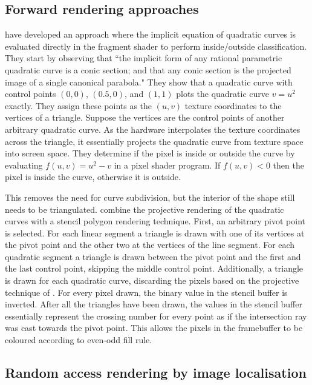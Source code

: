 \documentclass[11pt,a4paper,twoside]{article}
\begin{document}
\subsection {Forward rendering approaches}

\cite{LoopBlinn05} have developed an approach where the implicit equation of quadratic curves is evaluated directly in the fragment shader to perform inside/outside classification. They start by observing that ``the implicit form of any rational parametric quadratic curve is a conic section; and that any conic section is the projected image of a single canonical parabola." They show that a quadratic curve with control points $(0,0)$, $(0.5,0)$, and $(1,1)$ plots the quadratic curve $v = u^2$ exactly. They assign these points as the $(u,v)$ texture coordinates to the vertices of a triangle. Suppose the vertices are the control points of another arbitrary quadratic curve. As the hardware interpolates the texture coordinates across the triangle, it essentially projects the quadratic curve from texture space into screen space. They determine if the pixel is inside or outside the curve by evaluating $f(u,v) = u^2 - v$ in a pixel shader program. If $f(u,v) < 0$ then the pixel is inside the curve, otherwise it is outside.

This removes the need for curve subdivision, but the interior of the shape still needs to be triangulated. \cite{Kokojima06} combine the projective rendering of the quadratic curves with a stencil polygon rendering technique. First, an arbitrary pivot point is selected. For each linear segment a triangle is drawn with one of its vertices at the pivot point and the other two at the vertices of the line segment. For each quadratic segment a triangle is drawn between the pivot point and the first and the last control point, skipping the middle control point. Additionally, a triangle is drawn for each quadratic curve, discarding the pixels based on the projective technique of \cite{LoopBlinn05}. For every pixel drawn, the binary value in the stencil buffer is inverted. After all the triangles have been drawn, the values in the stencil buffer essentially represent the crossing number for every point as if the intersection ray was cast towards the pivot point. This allows the pixels in the framebuffer to be coloured according to even-odd fill rule.

\subsection {Random access rendering by image localisation}
\end{document}
